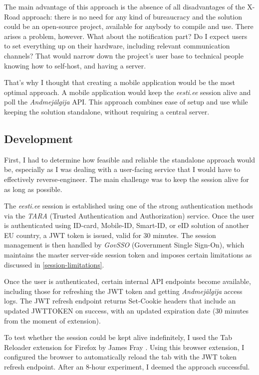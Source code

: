 The main advantage of this approach is the absence of all disadvantages of the X-Road approach: there is no need for any kind of bureaucracy and the solution could be an open-source project, available for anybody to compile and use. There arises a problem, however. What about the notification part? Do I expect users to set everything up on their hardware, including relevant communication channels? That would narrow down the project's user base to technical people knowing how to self-host, and having a server.

That's why I thought that creating a mobile application would be the most optimal approach. A mobile application would keep the \textit{eesti.ee} session alive and poll the \textit{Andmejälgija} API. This approach combines ease of setup and use while keeping the solution standalone, without requiring a central server.

\subsection{Development}

First, I had to determine how feasible and reliable the standalone approach would be, especially as I was dealing with a user-facing service that I would have to effectively reverse-engineer. The main challenge was to keep the session alive for as long as possible.

The \textit{eesti.ee} session is established using one of the strong authentication methods via the \textit{TARA} (Trusted Authentication and Authorization) service. Once the user is authenticated using ID-card, Mobile-ID, Smart-ID, or eID solution of another EU country, a JWT token is issued, valid for 30 minutes. The session management is then handled by \textit{GovSSO} (Government Single Sign-On), which maintains the master server-side session token and imposes certain limitations as discussed in \ref{session-limitations}.

Once the user is authenticated, certain internal API endpoints become available, including those for refreshing the JWT token and getting \textit{Andmejälgija} access logs. The JWT refresh endpoint returns Set-Cookie headers that include an updated JWTTOKEN on success, with an updated expiration date (30 minutes from the moment of extension).

To test whether the session could be kept alive indefinitely, I used the Tab Reloader extension for Firefox by James Fray \cite{tab-reloader-addon}. Using this browser extension, I configured the browser to automatically reload the tab with the JWT token refresh endpoint. After an 8-hour experiment, I deemed the approach successful.

